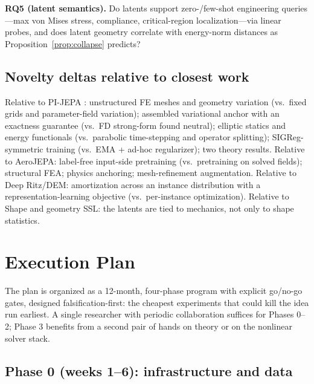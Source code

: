 \documentclass[11pt]{article}
\begin{document}
\textbf{RQ5 (latent semantics).} Do latents support zero-/few-shot
engineering queries---max von Mises stress, compliance, critical-region
localization---via linear probes, and does latent geometry correlate with
energy-norm distances as Proposition~\ref{prop:collapse} predicts?

\subsection{Novelty deltas relative to closest work}

Relative to PI-JEPA \cite{yee2026pijepa}: unstructured FE meshes and
geometry variation (vs.\ fixed grids and parameter-field variation);
assembled variational anchor with an exactness guarantee (vs.\ FD strong-form
found neutral); elliptic statics and energy functionals (vs.\ parabolic
time-stepping and operator splitting); SIGReg-symmetric training (vs.\ EMA +
ad-hoc regularizer); two theory results. Relative to AeroJEPA: label-free
input-side pretraining (vs.\ pretraining on solved fields); structural FEA;
physics anchoring; mesh-refinement augmentation. Relative to Deep Ritz/DEM:
amortization across an instance distribution with a representation-learning
objective (vs.\ per-instance optimization). Relative to Shape and geometry
SSL: the latents are tied to mechanics, not only to shape statistics.

\section{Execution Plan}
\label{sec:plan}

The plan is organized as a 12-month, four-phase program with explicit
go/no-go gates, designed falsification-first: the cheapest experiments that
could kill the idea run earliest. A single researcher with periodic
collaboration suffices for Phases 0--2; Phase 3 benefits from a second pair
of hands on theory or on the nonlinear solver stack.

\subsection{Phase 0 (weeks 1--6): infrastructure and data}
\end{document}
